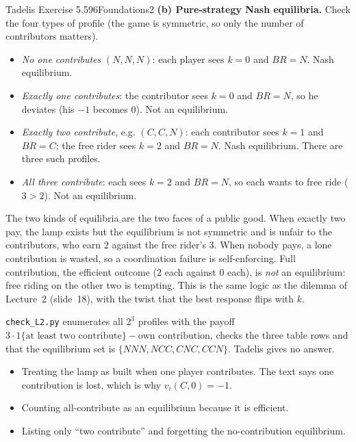 \begin{exsol}{Tadelis Exercise 5.5}{96}{Foundations}{2}
\textbf{(b) Pure-strategy Nash equilibria.} Check the four types of profile (the game is symmetric,
so only the number of contributors matters).
\begin{itemize}
  \item \emph{No one contributes} $(N,N,N)$: each player sees $k = 0$ and $BR = N$. Nash equilibrium.
  \item \emph{Exactly one contributes}: the contributor sees $k = 0$ and $BR = N$, so he deviates
  (his $-1$ becomes $0$). Not an equilibrium.
  \item \emph{Exactly two contribute}, e.g. $(C,C,N)$: each contributor sees $k = 1$ and $BR = C$;
  the free rider sees $k = 2$ and $BR = N$. Nash equilibrium. There are three such profiles.
  \item \emph{All three contribute}: each sees $k = 2$ and $BR = N$, so each wants to free ride
  ($3 > 2$). Not an equilibrium.
\end{itemize}

\interp The two kinds of equilibria are the two faces of a public good. When exactly two pay, the
lamp exists but the equilibrium is not symmetric and is unfair to the contributors, who earn $2$
against the free rider's $3$. When nobody pays, a lone contribution is wasted, so a coordination
failure is self-enforcing. Full contribution, the efficient outcome ($2$ each against $0$ each),
is \emph{not} an equilibrium: free riding on the other two is tempting. This is the same logic as
the dilemma of Lecture~2 (slide~18), with the twist that the best response flips with $k$.

\verify \texttt{check\_L2.py} enumerates all $2^3$ profiles with the payoff $3\cdot 1\{\text{at least
two contribute}\} - \text{own contribution}$, checks the three table rows and that the equilibrium
set is $\{NNN, NCC, CNC, CCN\}$. Tadelis gives no answer.

\mistakes
\begin{itemize}
  \item Treating the lamp as built when one player contributes. The text says one contribution is
  lost, which is why $v_i(C, 0) = -1$.
  \item Counting all-contribute as an equilibrium because it is efficient.
  \item Listing only ``two contribute'' and forgetting the no-contribution equilibrium.
\end{itemize}
\end{exsol}
